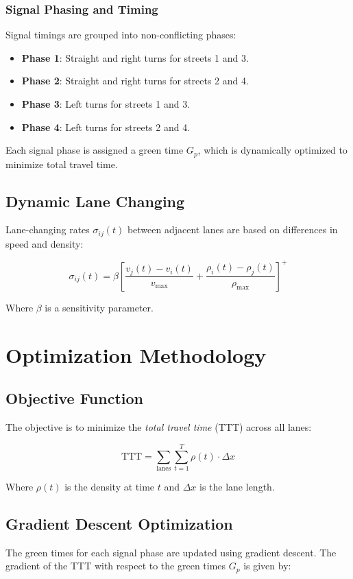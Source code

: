 \documentclass[conference]{IEEEtran}
\begin{document}
\subsubsection{Signal Phasing and Timing}
Signal timings are grouped into non-conflicting phases:
\begin{itemize}
    \item \textbf{Phase 1}: Straight and right turns for streets 1 and 3.
    \item \textbf{Phase 2}: Straight and right turns for streets 2 and 4.
    \item \textbf{Phase 3}: Left turns for streets 1 and 3.
    \item \textbf{Phase 4}: Left turns for streets 2 and 4.
\end{itemize}
Each signal phase is assigned a green time $G_p$, which is dynamically optimized to minimize total travel time.

\subsection{Dynamic Lane Changing}
Lane-changing rates $\sigma_{ij}(t)$ between adjacent lanes are based on differences in speed and density:

\begin{equation}
\sigma_{ij}(t) = \beta \left[ \frac{v_j(t) - v_i(t)}{v_{\text{max}}} + \frac{\rho_i(t) - \rho_j(t)}{\rho_{\text{max}}} \right]^+
\end{equation}

Where $\beta$ is a sensitivity parameter.

\section{Optimization Methodology}

\subsection{Objective Function}
The objective is to minimize the \textit{total travel time} (TTT) across all lanes:

\begin{equation}
\text{TTT} = \sum_{\text{lanes}} \sum_{t=1}^{T} \rho(t) \cdot \Delta x
\end{equation}

Where $\rho(t)$ is the density at time $t$ and $\Delta x$ is the lane length.

\subsection{Gradient Descent Optimization}
The green times for each signal phase are updated using gradient descent. The gradient of the TTT with respect to the green times $G_p$ is given by:
\end{document}

